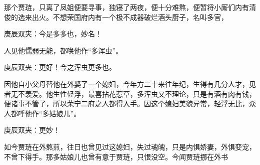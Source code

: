 \begin{parag}
    那个贾琏，只离了凤姐便要寻事，独寝了两夜，便十分难熬，便暂将小厮们内有清俊的选来出火。不想荣国府内有一个极不成器破烂酒头厨子，名叫多官，\begin{note}庚辰双夹：今是多多也，妙名！\end{note}人见他懦弱无能，都唤他作“多浑虫”。\begin{note}庚辰双夹：更好！今之浑虫更多也。\end{note}因他自小父母替他在外娶了一个媳妇，今年方二十来往年纪，生得有几分人才，见者无不羡爱。他生性轻浮，最喜拈花惹草，多浑虫又不理论，只是有酒有肉有钱，便诸事不管了，所以荣宁二府之人都得入手。因这个媳妇美貌异常，轻浮无比，众人都呼他作“多姑娘儿”。\begin{note}庚辰双夹：更妙！\end{note}如今贾琏在外熬煎，往日也曾见过这媳妇，失过魂魄，只是内惧娇妻，外惧娈宠，不曾下得手。那多姑娘儿也曾有意于贾琏，只恨没空。今闻贾琏挪在外书
\end{parag}
